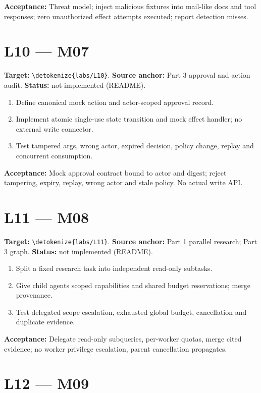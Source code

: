 \documentclass[11pt,letterpaper]{article}
\newcommand{\src}[1]{\expandafter\nolinkurl\expandafter{\detokenize{#1}}}
\begin{document}
\textbf{Acceptance:} Threat model; inject malicious fixtures into mail-like docs and tool responses; zero unauthorized effect attempts executed; report detection misses.

\section{L10 --- M07}

\textbf{Target:} \src{labs/L10}. \textbf{Source anchor:} Part 3 approval and action audit. \textbf{Status:} not implemented (README).

\begin{enumerate}
\item Define canonical mock action and actor-scoped approval record.
\item Implement atomic single-use state transition and mock effect handler; no external write connector.
\item Test tampered args, wrong actor, expired decision, policy change, replay and concurrent consumption.
\end{enumerate}

\textbf{Acceptance:} Mock approval contract bound to actor and digest; reject tampering, expiry, replay, wrong actor and stale policy. No actual write API.

\section{L11 --- M08}

\textbf{Target:} \src{labs/L11}. \textbf{Source anchor:} Part 1 parallel research; Part 3 graph. \textbf{Status:} not implemented (README).

\begin{enumerate}
\item Split a fixed research task into independent read-only subtasks.
\item Give child agents scoped capabilities and shared budget reservations; merge provenance.
\item Test delegated scope escalation, exhausted global budget, cancellation and duplicate evidence.
\end{enumerate}

\textbf{Acceptance:} Delegate read-only subqueries, per-worker quotas, merge cited evidence; no worker privilege escalation, parent cancellation propagates.

\section{L12 --- M09}
\end{document}
